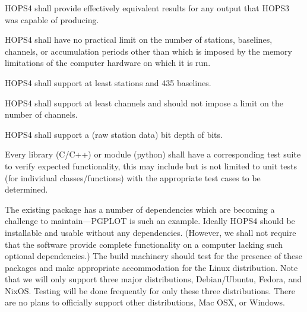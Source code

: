 \begin{description}

 HOPS4 shall provide effectively equivalent results for any output that HOPS3 was capable of producing.

 HOPS4 shall have no practical limit on the number of stations,
baselines, channels, or accumulation periods other than which is imposed by the
memory limitations of the computer hardware on which it is run.


 HOPS4 shall support at least \FIX[30] stations and 435 baselines.

 HOPS4 shall support at least \FIX[128] channels and should not impose a
 limit on the number of channels.

 HOPS4 shall support a (raw station data) bit depth of \FIX[2] bits.

 Every library (C/C++) or module (python) shall have a corresponding
test suite to verify expected functionality, this may include but is not limited
to unit tests (for individual classes/functions) with the appropriate test
cases to be determined.


\end{description}

The existing package has a number of dependencies which are becoming
a challenge to maintain---\acs{PGPLOT} is such an example.  Ideally
HOPS4 should be installable and usable without any dependencies.
(However, we shall not require that the software provide complete functionality
on a computer lacking such optional dependencies.) The build machinery should test
for the presence of these packages and make appropriate accommodation for
the Linux distribution. Note that we will only support three major distributions,
Debian/Ubuntu, Fedora, and NixOS. Testing will be done frequently for only these
three distributions. There are no plans to officially support other distributions,
Mac OSX, or Windows.

